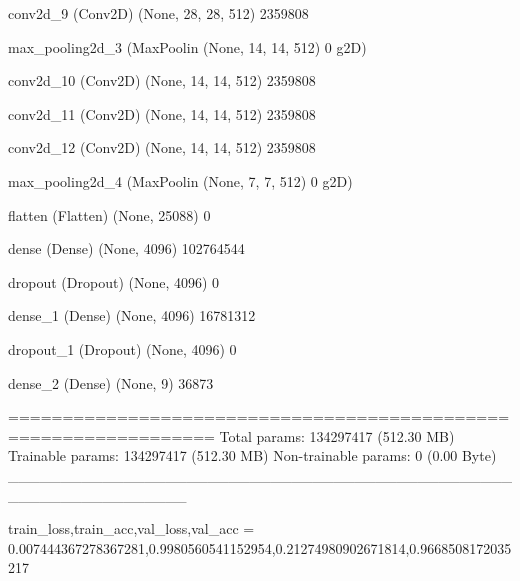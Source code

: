 \documentclass[11pt, a4paper]{article} %
\begin{document}
 conv2d_9 (Conv2D)           (None, 28, 28, 512)       2359808   
                                                                 
 max_pooling2d_3 (MaxPoolin  (None, 14, 14, 512)       0         
 g2D)                                                            
                                                                 
 conv2d_10 (Conv2D)          (None, 14, 14, 512)       2359808   
                                                                 
 conv2d_11 (Conv2D)          (None, 14, 14, 512)       2359808   
                                                                 
 conv2d_12 (Conv2D)          (None, 14, 14, 512)       2359808   
                                                                 
 max_pooling2d_4 (MaxPoolin  (None, 7, 7, 512)         0         
 g2D)                                                            
                                                                 
 flatten (Flatten)           (None, 25088)             0         
                                                                 
 dense (Dense)               (None, 4096)              102764544 
                                                                 
 dropout (Dropout)           (None, 4096)              0         
                                                                 
 dense_1 (Dense)             (None, 4096)              16781312  
                                                                 
 dropout_1 (Dropout)         (None, 4096)              0         
                                                                 
 dense_2 (Dense)             (None, 9)                 36873     
                                                                 
=================================================================
Total params: 134297417 (512.30 MB)
Trainable params: 134297417 (512.30 MB)
Non-trainable params: 0 (0.00 Byte)
_________________________________________________________________

train_loss,train_acc,val_loss,val_acc = 0.007444367278367281,0.9980560541152954,0.21274980902671814,0.9668508172035217
\end{document}
